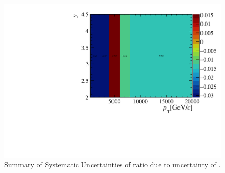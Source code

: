 \begin{figure}[H]
  \begin{center}
    \includegraphics[width=0.8\linewidth,totalheight=0.35\textheight]{pdf/TISTOS.pdf}
  \end{center}
  \caption{
    Summary of Systematic Uncertainties of ratio due to uncertainty of \effTri.}
  \label{Sys_Trigger}
\end{figure}


